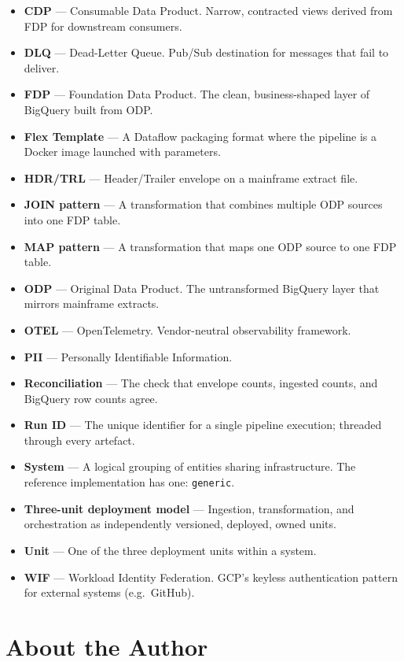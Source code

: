 \documentclass[
  11pt,
  british,
  oneside]{book}
\providecommand{\tightlist}{%
  \setlength{\itemsep}{0pt}\setlength{\parskip}{0pt}}
\begin{document}
\begin{itemize}
\tightlist
\item
  \textbf{CDP} --- Consumable Data Product. Narrow, contracted views
  derived from FDP for downstream consumers.
\item
  \textbf{DLQ} --- Dead-Letter Queue. Pub/Sub destination for messages
  that fail to deliver.
\item
  \textbf{FDP} --- Foundation Data Product. The clean, business-shaped
  layer of BigQuery built from ODP.
\item
  \textbf{Flex Template} --- A Dataflow packaging format where the
  pipeline is a Docker image launched with parameters.
\item
  \textbf{HDR/TRL} --- Header/Trailer envelope on a mainframe extract
  file.
\item
  \textbf{JOIN pattern} --- A transformation that combines multiple ODP
  sources into one FDP table.
\item
  \textbf{MAP pattern} --- A transformation that maps one ODP source to
  one FDP table.
\item
  \textbf{ODP} --- Original Data Product. The untransformed BigQuery
  layer that mirrors mainframe extracts.
\item
  \textbf{OTEL} --- OpenTelemetry. Vendor-neutral observability
  framework.
\item
  \textbf{PII} --- Personally Identifiable Information.
\item
  \textbf{Reconciliation} --- The check that envelope counts, ingested
  counts, and BigQuery row counts agree.
\item
  \textbf{Run ID} --- The unique identifier for a single pipeline
  execution; threaded through every artefact.
\item
  \textbf{System} --- A logical grouping of entities sharing
  infrastructure. The reference implementation has one:
  \texttt{generic}.
\item
  \textbf{Three-unit deployment model} --- Ingestion, transformation,
  and orchestration as independently versioned, deployed, owned units.
\item
  \textbf{Unit} --- One of the three deployment units within a system.
\item
  \textbf{WIF} --- Workload Identity Federation. GCP's keyless
  authentication pattern for external systems (e.g.~GitHub).
\end{itemize}

\newpage

\hypertarget{about-the-author}{%
\chapter{About the Author}\label{about-the-author}}
\end{document}
